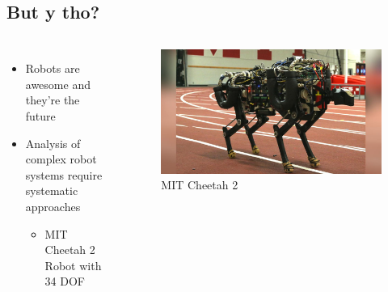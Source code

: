 \documentclass{beamer}
\begin{document}
\subsection{But y tho?}
\begin{frame}
\begin{columns}
\begin{itemize}
\item Robots are awesome and they're the future
\item Analysis of complex robot systems require systematic approaches
\begin{itemize}
\item MIT Cheetah 2 Robot with 34 DOF
\end{itemize}
\end{itemize}

\begin{figure}
\caption{MIT Cheetah 2}
\includegraphics[scale=0.18]{cheetah.jpg}
\end{figure}
\end{columns}

\end{frame}
\end{document}
